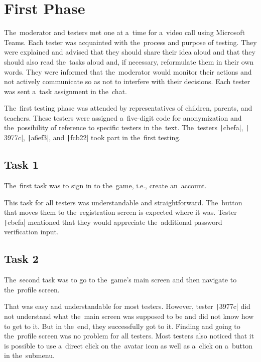\section{First Phase}

The~moderator and testers met one at a~time for a~video call using Microsoft Teams.
Each tester was acquainted with the~process and purpose of testing.
They were explained and advised that they should share their idea aloud and that they should also read the~tasks aloud and, if necessary, reformulate them in their own words.
They were informed that the~moderator would monitor their actions and not actively communicate so as not to interfere with their decisions.
Each tester was sent a~task assignment in the~chat.

The~first testing phase was attended by representatives of children, parents, and teachers.
These testers were assigned a~five-digit code for anonymization and the~possibility of reference to specific testers in the~text.
The~testers \texttt|cbefa|, \texttt| 3977c|, \texttt|a6ef3|, and \texttt|fcb22| took part in the~first testing.

\subsection*{Task 1}

The~first task was to sign in to the~game, i.e., create an~account.

This task for all testers was understandable and straightforward.
The~button that moves them to the~registration screen is expected where it was.
Tester \texttt|cbefa| mentioned that they would appreciate the~additional password verification input.

\subsection*{Task 2}

The~second task was to go to the~game's main screen and then navigate to the~profile screen.

That was easy and understandable for most testers.
However, tester \texttt|3977c| did not understand what the~main screen was supposed to be and did not know how to get to it.
But in the~end, they successfully got to it.
Finding and going to the~profile screen was no problem for all testers.
Most testers also noticed that it is possible to use a~direct click on the~avatar icon as well as a~click on a~button in the~submenu.

